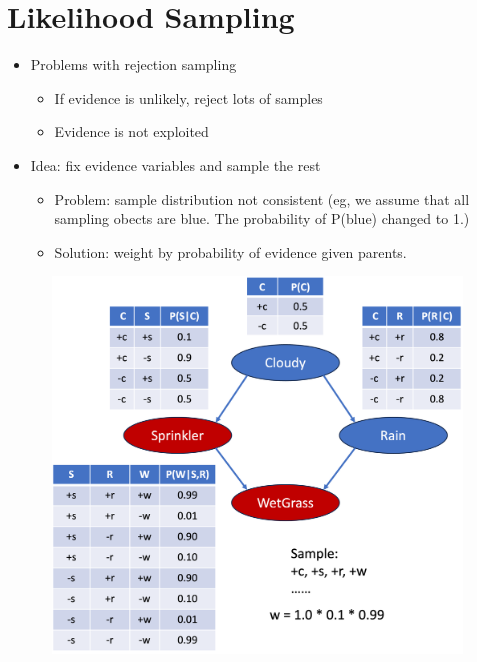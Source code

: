 \documentclass[11pt,a4paper]{report}
\begin{document}
\section{Likelihood Sampling}

\begin{itemize}
    \item Problems with rejection sampling
        \begin{itemize}
            \item If evidence is unlikely, reject lots of samples
            \item Evidence is not exploited
        \end{itemize}
    
    \item Idea: fix evidence variables and sample the rest
        \begin{itemize}
            \item Problem: sample distribution not consistent (eg, we assume that all sampling obects are blue. The probability of P(blue) changed to 1.)
            \item Solution: weight by probability of evidence given parents.
        \end{itemize}
    
    \includegraphics[width=12cm, height = 10cm]{sampling_likelihood.png}


\end{itemize}
\end{document}
